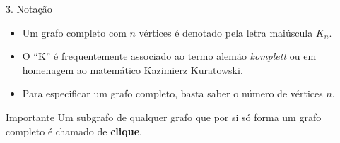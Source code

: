 \documentclass[9pt]{beamer}
\begin{document}
    \begin{frame}{3. Notação}
        \begin{itemize}
            \item Um grafo completo com $n$ vértices é denotado pela letra maiúscula \textbf{$K_n$}.
            \item O ``K'' é frequentemente associado ao termo alemão \textit{komplett} ou em homenagem ao matemático Kazimierz Kuratowski.
            \item Para especificar um grafo completo, basta saber o número de vértices $n$.
        \end{itemize}
        \vspace{0.5cm}
        \begin{alertblock}{Importante}
            Um subgrafo de qualquer grafo que por si só forma um grafo completo é chamado de \textbf{clique}.
        \end{alertblock}
    \end{frame}
\end{document}
